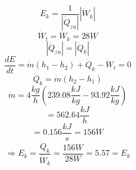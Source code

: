 

\item[d)] \[
    E_k = \frac{1}{\left| \dot{Q}_{zu} \right|} \left| \dot{W}_k \right|
    \]
    \[
    \dot{W}_t = \dot{W}_k = 28W
    \]
    \[
    \left| \dot{Q}_{zu} \right| = \left| \dot{Q}_k \right|
    \]
    \[
    \frac{dE}{dt} = \dot{m} \left( h_1 - h_2 \right) + \dot{Q}_k - \dot{W}_t = 0
    \]
    \[
    \dot{Q}_k = \dot{m} \left( h_2 - h_1 \right)
    \]
    \[
    \dot{m} = 4 \frac{kg}{h} \left( 239.08 \frac{kJ}{kg} - 93.92 \frac{kJ}{kg} \right)
    \]
    \[
    = 562.64 \frac{kJ}{h}
    \]
    \[
    = 0.156 \frac{kJ}{s} = 156W
    \]
    \[
    \Rightarrow E_k = \frac{\dot{Q}_k}{\dot{W}_k} = \frac{156W}{28W} = 5.57 = E_k
    \]